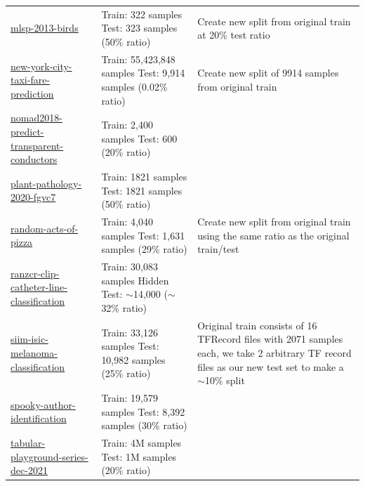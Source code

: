 \documentclass{article} %
\begin{document}
\begin{longtable}{m{4cm} m{4.5cm} m{4cm}}
    \href{https://www.kaggle.com/c/mlsp-2013-birds}{mlsp-2013-birds} &  Train: 322 samples \newline  Test: 323 samples (50\% ratio) & Create new split from original train at 20\% test ratio \\
    \href{https://www.kaggle.com/c/new-york-city-taxi-fare-prediction}{new-york-city-taxi-fare-prediction} &  Train: 55,423,848 samples \newline  Test: 9,914 samples (0.02\% ratio) & Create new split of 9914 samples from original train \\
    \href{https://www.kaggle.com/c/nomad2018-predict-transparent-conductors}{nomad2018-predict-transparent-conductors} &  Train: 2,400 samples \newline  Test: 600 (20\% ratio) & \\
    \href{https://www.kaggle.com/c/plant-pathology-2020-fgvc7}{plant-pathology-2020-fgvc7} &  Train: 1821 samples \newline  Test: 1821 samples (50\% ratio) & \\
    \href{https://www.kaggle.com/c/random-acts-of-pizza}{random-acts-of-pizza} &  Train: 4,040 samples \newline  Test: 1,631 samples (29\% ratio) & Create new split from original train using the same ratio as the original train/test \\
    \href{https://www.kaggle.com/c/ranzcr-clip-catheter-line-classification}{ranzcr-clip-catheter-line-classification} &  Train: 30,083 samples \newline Hidden  Test: $\sim$14,000 ($\sim$32\% ratio) & \\
    \href{https://www.kaggle.com/c/siim-isic-melanoma-classification}{siim-isic-melanoma-classification} &  Train: 33,126 samples \newline  Test: 10,982 samples (25\% ratio) & Original train consists of 16 TFRecord files with 2071 samples each, we take 2 arbitrary TF record files as our new test set to make a $\sim$10\% split \\
    \href{https://www.kaggle.com/c/spooky-author-identification}{spooky-author-identification} &  Train: 19,579 samples \newline  Test: 8,392 samples (30\% ratio) & \\
    \href{https://www.kaggle.com/c/tabular-playground-series-dec-2021}{tabular-playground-series-dec-2021} &  Train: 4M samples \newline  Test: 1M samples (20\% ratio) & \\

\end{longtable}
\end{document}
